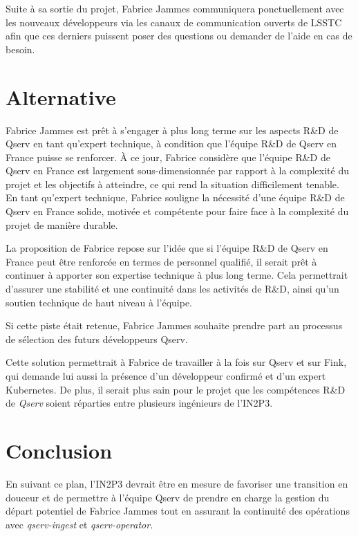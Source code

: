 \documentclass[french] {article}
\begin{document}
Suite à sa sortie du projet, Fabrice Jammes communiquera ponctuellement avec les nouveaux développeurs via les canaux de communication ouverts de LSSTC afin que ces derniers puissent poser
des questions ou demander de l'aide en cas de besoin.

\section{Alternative}

Fabrice Jammes est prêt à s'engager à plus long terme sur les aspects R\&D de Qserv en tant qu'expert technique, à condition que l'équipe R\&D de Qserv en France puisse se renforcer. À ce jour, Fabrice considère
que l'équipe R\&D de Qserv en France est largement sous-dimensionnée par rapport à la complexité du projet et les objectifs à atteindre, ce qui rend la situation difficilement tenable. En tant qu'expert technique,  Fabrice souligne la nécessité
d'une équipe R\&D de Qserv en France solide, motivée et compétente pour faire face à la complexité du projet de manière durable.

La proposition de Fabrice repose sur l'idée que si l'équipe R\&D de Qserv en France peut être renforcée en termes de personnel qualifié, il serait prêt à continuer à apporter son expertise technique
à plus long terme. Cela permettrait d'assurer une stabilité et une continuité dans les activités de R\&D, ainsi qu'un soutien technique de haut niveau à l'équipe.

Si cette piste était retenue, Fabrice Jammes souhaite prendre part au processus de sélection des futurs développeurs Qserv.

Cette solution permettrait à Fabrice de travailler à la fois sur Qserv et sur Fink, qui demande lui aussi la présence d'un développeur confirmé et d'un expert Kubernetes. De plus, il serait plus sain pour le projet que les compétences R\&D de \textit{Qserv} soient réparties entre plusieurs ingénieurs de l'IN2P3.

\section{Conclusion}

En suivant ce plan, l'IN2P3 devrait être en mesure de favoriser une transition en douceur et de permettre à l'équipe Qserv de prendre en charge la gestion du départ potentiel de Fabrice Jammes tout en
assurant la continuité des opérations avec \textit{qserv-ingest} et \textit{qserv-operator}.
\end{document}
